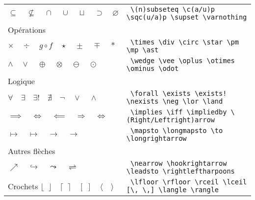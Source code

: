 \documentclass{report}
\begin{document}
\begin{tabular}{ll}
$ \subseteq \quad \nsubseteq \quad \cap \quad \cup \quad \sqcup \quad \supset \quad \varnothing $
&
\texttt{
\textbackslash{}(n)subseteq \textbackslash{}c(a/u)p \textbackslash{}sqc(u/a)p \textbackslash{}supset \textbackslash{}varnothing
}
\\

Opérations
&
\\

$ \times \quad \div \quad g \circ f \quad \star \quad \pm \quad \mp \quad \ast $
&
\texttt{
\textbackslash{}times \textbackslash{}div \textbackslash{}circ \textbackslash{}star \textbackslash{}pm \textbackslash{}mp \textbackslash{}ast 
}
\\

$ \wedge \quad \vee \quad \oplus \quad \otimes \quad \ominus \quad \odot $
&
\texttt{
\textbackslash{}wedge \textbackslash{}vee \textbackslash{}oplus \textbackslash{}otimes \textbackslash{}ominus \textbackslash{}odot	
}
\\

Logique
&
\\

$ \forall \quad \exists \quad \exists! \quad \nexists \quad \neg \quad \lor \quad \land $
&
\texttt{
\textbackslash{}forall \textbackslash{}exists \textbackslash{}exists! \textbackslash{}nexists \textbackslash{}neg \textbackslash{}lor \textbackslash{}land
}
\\

$ \implies \quad \iff \quad \impliedby \quad \Rightarrow \quad \Leftrightarrow $
&
\texttt{
\textbackslash{}implies \textbackslash{}iff \textbackslash{}impliedby \textbackslash{}(Right/Leftright)arrow
}
\\

$ \mapsto \quad \longmapsto \quad \to \quad \longrightarrow $
&
\texttt{
\textbackslash{}mapsto \textbackslash{}longmapsto \textbackslash{}to \textbackslash{}longrightarrow
}
\\

Autres flèches
&
\\

$  \nearrow \quad \hookrightarrow \quad \leadsto \quad \rightleftharpoons $
&
\texttt{
\textbackslash{}nearrow \textbackslash{}hookrightarrow \textbackslash{}leadsto \textbackslash{}rightleftharpoons
}
\\

Crochets $ \lfloor \; \; \rfloor \quad \lceil \; \; \rceil \quad [\, \,] \quad \langle \quad \rangle $
&
\texttt{
\textbackslash{}lfloor \textbackslash{}rfloor \textbackslash{}rceil \textbackslash{}lceil [\textbackslash{}, \textbackslash{},] \textbackslash{}langle \textbackslash{}rangle 
}
\\


\end{tabular}
\end{document}
